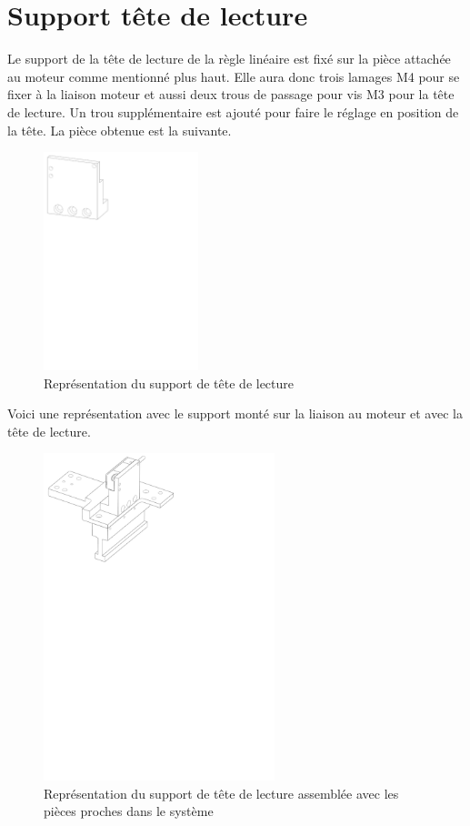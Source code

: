 \section{Support tête de lecture}\label{sec:SupTeteLect}
Le support de la tête de lecture de la règle linéaire est fixé sur la pièce attachée au moteur comme mentionné plus haut. Elle aura donc trois
lamages M4 pour se fixer à la liaison moteur et aussi deux trous de passage pour vis M3 pour la tête de lecture. Un trou supplémentaire est ajouté
pour faire le réglage en position de la tête. La pièce obtenue est la suivante.

\begin{figure}[H]
  \centering
  \includegraphics[width = 0.4\textwidth]{assets/figures/SupportTeteLecture.svg}
  \caption{Représentation du support de tête de lecture}
  \label{fig:SupTeteLect}
\end{figure}

Voici une représentation avec le support monté sur la liaison au moteur et avec la tête de lecture.

\begin{figure}[H]
  \centering
  \includegraphics[width = 0.6\textwidth]{assets/figures/AssemblageMesureLineaire.svg}
  \caption{Représentation du support de tête de lecture assemblée avec les pièces proches dans le système}
  \label{fig:AssMesLin}
\end{figure}

